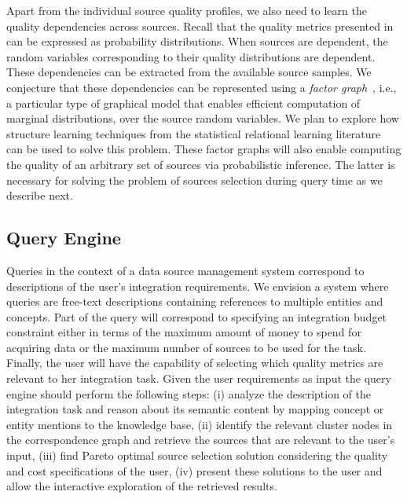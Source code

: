 \documentclass{sig-alternate}
\begin{document}
Apart from the individual source quality profiles, we also need to learn the quality dependencies across sources. Recall that the quality metrics presented in  
can be expressed as probability distributions. When sources are dependent, the random variables corresponding to their quality distributions are dependent. These dependencies can be extracted from the available source samples.  We conjecture that these dependencies can be represented using a {\em factor graph}~\cite{koller:2009}, i.e., a particular type of graphical model that enables efficient computation of marginal distributions, over the source random variables. We plan to explore how structure learning techniques from the statistical relational learning literature~\cite{getoor:2007} can be used to solve this problem. These factor graphs will also enable computing the quality of an arbitrary set of sources via probabilistic inference. The latter is necessary for solving the problem of sources selection during query time as we describe next. 

\subsection{Query Engine}
\label{sec:queryengine}
Queries in the context of a data source management system correspond to descriptions of the user's integration requirements. We envision a system where queries are free-text descriptions containing references to multiple entities and concepts. Part of the query will correspond to specifying an integration budget constraint either in terms of the maximum amount of money to spend for acquiring data or the maximum number of sources to be used for the task. Finally, the user will have the capability of selecting which quality metrics are relevant to her integration task. Given the user requirements as input the query engine should perform the following steps: (i) analyze the description of the integration task and reason about its semantic content by mapping concept or entity mentions to the knowledge base, (ii) identify the relevant cluster nodes in the correspondence graph and retrieve the sources that are relevant to the user's input, (iii) find Pareto optimal source selection solution considering the quality and cost specifications of the user, (iv) present these solutions to the user and allow the interactive exploration of the retrieved results.
\end{document}
